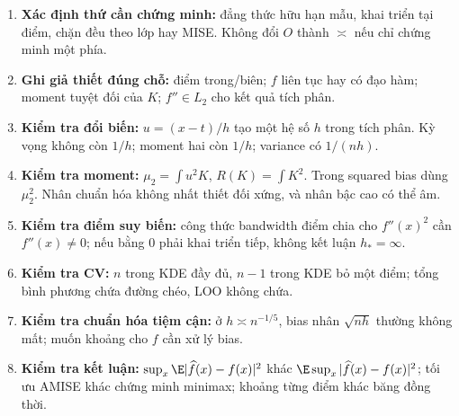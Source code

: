 \begin{enumerate}
\item \textbf{Xác định thứ cần chứng minh:} đẳng thức hữu hạn mẫu, khai triển tại điểm, chặn đều theo lớp hay MISE. Không đổi $O$ thành $\asymp$ nếu chỉ chứng minh một phía.
\item \textbf{Ghi giả thiết đúng chỗ:} điểm trong/biên; $f$ liên tục hay có đạo hàm; moment tuyệt đối của $K$; $f''\in L_2$ cho kết quả tích phân.
\item \textbf{Kiểm tra đổi biến:} $u=(x-t)/h$ tạo một hệ số $h$ trong tích phân. Kỳ vọng không còn $1/h$; moment hai còn $1/h$; variance có $1/(nh)$.
\item \textbf{Kiểm tra moment:} $\mu_2=\int u^2K$, $R(K)=\int K^2$. Trong squared bias dùng $\mu_2^2$. Nhân chuẩn hóa không nhất thiết đối xứng, và nhân bậc cao có thể âm.
\item \textbf{Kiểm tra điểm suy biến:} công thức bandwidth điểm chia cho $f''(x)^2$ cần $f''(x)\ne0$; nếu bằng 0 phải khai triển tiếp, không kết luận $h_*=\infty$.
\item \textbf{Kiểm tra CV:} $n$ trong KDE đầy đủ, $n-1$ trong KDE bỏ một điểm; tổng bình phương chứa đường chéo, LOO không chứa.
\item \textbf{Kiểm tra chuẩn hóa tiệm cận:} ở $h\asymp n^{-1/5}$, bias nhân $\sqrt{nh}$ thường không mất; muốn khoảng cho $f$ cần xử lý bias.
\item \textbf{Kiểm tra kết luận:} $\sup_x\E|\widehat f(x)-f(x)|^2$ khác $\E\sup_x|\widehat f(x)-f(x)|^2$; tối ưu AMISE khác chứng minh minimax; khoảng từng điểm khác băng đồng thời.
\end{enumerate}


